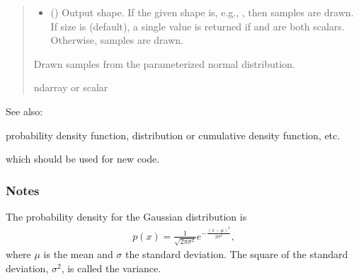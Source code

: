 \documentclass[letterpaper,10pt,english]{sphinxmanual}
\begin{document}
\begin{fulllineitems}
\begin{quote}
\begin{description}
\begin{itemize}
\item {} 
\sphinxAtStartPar
{} (\sphinxstyleliteralemphasis{\sphinxupquote{, }}) \textendash{} Output shape.  If the given shape is, e.g., , then
 samples are drawn.  If size is  (default),
a single value is returned if  and  are both scalars.
Otherwise,  samples are drawn.

\end{itemize}

\sphinxAtStartPar
{} \textendash{} Drawn samples from the parameterized normal distribution.

\sphinxAtStartPar
ndarray or scalar

\end{description}\end{quote}


\begin{sphinxseealso}{See also:}
\begin{description}
\sphinxAtStartPar
probability density function, distribution or cumulative density function, etc.

\sphinxAtStartPar
which should be used for new code.

\end{description}


\end{sphinxseealso}

\subsubsection*{Notes}

\sphinxAtStartPar
The probability density for the Gaussian distribution is
\begin{equation*}
\begin{split}p(x) = \frac{1}{\sqrt{ 2 \pi \sigma^2 }}
e^{ - \frac{ (x - \mu)^2 } {2 \sigma^2} },\end{split}
\end{equation*}
\sphinxAtStartPar
where \(\mu\) is the mean and \(\sigma\) the standard
deviation. The square of the standard deviation, \(\sigma^2\),
is called the variance.


\end{fulllineitems}
\end{document}

